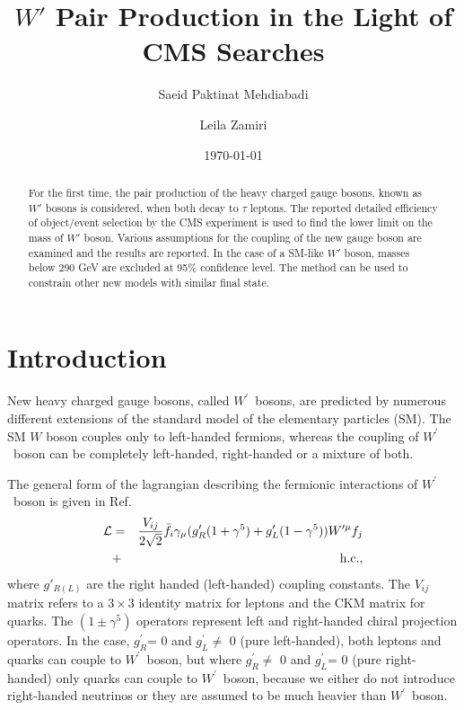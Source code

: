 \documentclass[preprint,showpacs,preprintnumbers]{revtex4}
\newcommand{\wprime}{\ensuremath{W^\prime}~}
\newcommand{\gR}{\ensuremath{g^\prime_R}}
\newcommand{\gL}{\ensuremath{g^\prime_L}}
\begin{document}
\title{$W'$ Pair Production in the Light of CMS Searches}



\author{Saeid Paktinat Mehdiabadi}

\author{Leila Zamiri}

\date{\today}

\begin{abstract}
For the first time, the pair production of the heavy charged gauge bosons, known as $W'$ bosons is considered, when both decay to $\tau$ leptons. The reported detailed efficiency of object/event selection by the CMS experiment is used to find the lower limit on the mass of $W'$ boson. Various assumptions for the coupling of the new gauge boson are examined and the results are reported. In the case of a SM-like $W'$ boson, masses below 290 GeV are excluded at 95\% confidence level. The method can be used to constrain other new models with  similar final state.
\end{abstract}

\maketitle

\section{Introduction}\label{sec:int} 
New heavy charged gauge bosons, called \wprime bosons, are predicted by numerous different extensions of the standard model of the elementary particles (SM). 
The SM $W$ boson couples only to left-handed fermions, whereas the coupling of \wprime boson can be completely left-handed, right-handed or a mixture of both. 

The general form of the lagrangian describing the fermionic interactions of \wprime boson is given in  Ref.~\cite{Sullivan:2002jt}
\begin{eqnarray}
{\cal L}& =& \frac{V_{ij}}{2\sqrt{2}}\bar{f_i} \gamma_{\mu}(g^\prime_{R} (1+{\gamma}^5)+
g^\prime_{L}
(1-{\gamma}^5)) W^{\prime \mu} f_j  \nonumber\\
&+& \mathrm{h.c.},
\label{eq:lagrangian}
\end{eqnarray}
where $g'_{R(L)}$ are the right handed (left-handed) coupling constants. The $V_{ij}$ matrix refers to a $3\times3$ identity matrix for leptons and the CKM matrix for quarks. The $(1\pm{\gamma^5})$ operators represent left and right-handed chiral projection operators. In the case, \gR = 0 and \gL $\neq$ 0 (pure left-handed), both leptons and quarks can couple to \wprime boson, but where \gR $\neq$ 0 and \gL = 0 (pure right-handed) only quarks can couple to \wprime boson, because we either do not introduce right-handed neutrinos or they are assumed to be much heavier than \wprime boson. 
\end{document}
